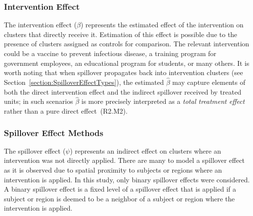 \documentclass{article}[11pt]
\begin{document}
\subsubsection{Intervention Effect}\label{Section:InterventionEffect}

The intervention effect ($\beta$) represents the estimated effect of the intervention on clusters that directly receive it. Estimation of this effect is possible due to the presence of clusters assigned as controls for comparison. The relevant intervention could be a vaccine to prevent infectious disease, a training program for government employees, an educational program for students, or many others. It is worth noting that when spillover propagates back into intervention clusters (see Section~\ref{section:SpilloverEffectTypes}), the estimated $\hat{\beta}$ may capture elements of both the direct intervention effect and the indirect spillover received by treated units; in such scenarios $\hat{\beta}$ is more precisely interpreted as a \textit{total treatment effect} rather than a pure direct effect~(R2.M2). 


\subsubsection{Spillover Effect Methods}\label{Section:SpilloverEffectMethods}

The spillover effect ($\psi$) represents an indirect effect on clusters where an intervention was not directly applied\cite{benjamin-chung_spillover_2017}\cite{benjamin-chung_extension_2024}. There are many to model a spillover effect as it is observed due to spatial proximity to subjects or regions where an intervention is applied. In this study, only binary spillover effects were considered. A binary spillover effect is a fixed level of a spillover effect that is applied if a subject or region is deemed to be a neighbor of a subject or region where the intervention is applied. 
\end{document}
